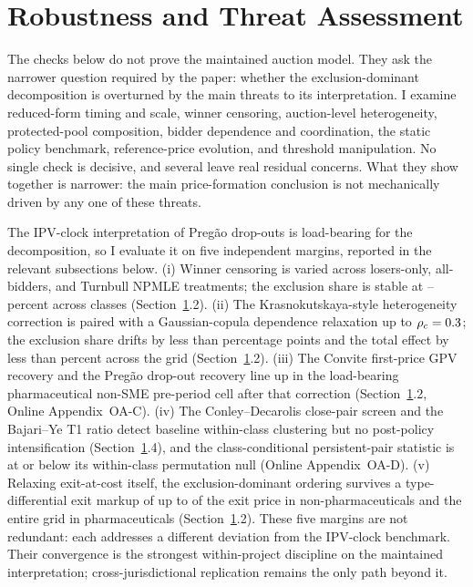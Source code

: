 \section{Robustness and Threat Assessment}\label{sec:robustness}

The checks below do not prove the maintained auction model. They ask the
narrower question required by the paper: whether the exclusion-dominant
decomposition is overturned by the main threats to its interpretation. I
examine reduced-form timing and scale, winner censoring, auction-level
heterogeneity, protected-pool composition, bidder dependence and
coordination, the static policy benchmark, reference-price evolution, and
threshold manipulation. No single check is decisive, and several leave real
residual concerns. What they show together is narrower: the main
price-formation conclusion is not mechanically driven by any one of these
threats.

The IPV-clock interpretation of Preg\~ao drop-outs is load-bearing for the
decomposition, so I evaluate it on five independent margins, reported in
the relevant subsections below. (i) Winner censoring is varied across
losers-only, all-bidders, and Turnbull NPMLE treatments; the exclusion
share is stable at \turnbullShareNp{}--\turnbullSharePh{} percent across
classes (Section~\ref{sec:robustness}.2). (ii) The Krasnokutskaya-style
heterogeneity correction is paired with a Gaussian-copula dependence
relaxation up to $\rho_c=0.3$; the exclusion share drifts by less
than \ipvShareDriftPp{} percentage points and the total effect by less
than \ipvTotalDriftPct{} percent across the grid (Section~\ref{sec:robustness}.2).
(iii) The Convite first-price GPV recovery and the Preg\~ao drop-out
recovery line up in the load-bearing pharmaceutical non-SME pre-period
cell after that correction (Section~\ref{sec:robustness}.2,
Online Appendix~OA-C). (iv) The Conley--Decarolis close-pair screen and
the Bajari--Ye T1 ratio detect baseline within-class clustering but no
post-policy intensification (Section~\ref{sec:robustness}.4), and the
class-conditional persistent-pair statistic is at or below its
within-class permutation null (Online Appendix~OA-D). (v) Relaxing
exit-at-cost itself, the exclusion-dominant ordering survives a
type-differential exit markup of up to \ipvSlackBreakNp{} of the exit
price in non-pharmaceuticals and the entire grid in pharmaceuticals
(Section~\ref{sec:robustness}.2). These five margins are not redundant:
each addresses a different deviation from the IPV-clock benchmark. Their
convergence is the strongest within-project discipline on the maintained
interpretation; cross-jurisdictional replication remains the only path
beyond it.


